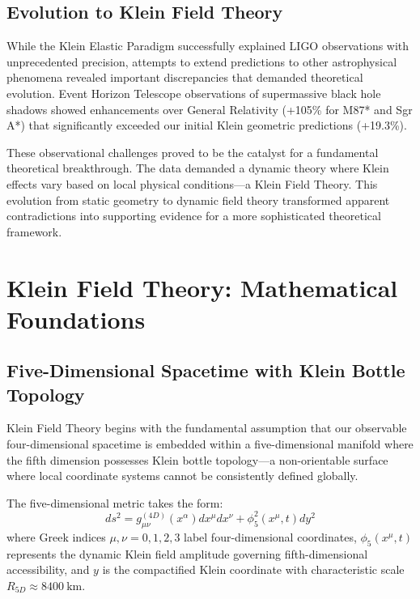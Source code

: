 \documentclass[aps,prl,twocolumn,showpacs,superscriptaddress,groupedaddress]{revtex4-1}
\newcommand{\phifive}{\phi_5}
\newcommand{\Rfive}{R_{5D}}
\begin{document}
\subsection{Evolution to Klein Field Theory}

While the Klein Elastic Paradigm successfully explained LIGO observations with unprecedented precision, attempts to extend predictions to other astrophysical phenomena revealed important discrepancies that demanded theoretical evolution. Event Horizon Telescope observations of supermassive black hole shadows showed enhancements over General Relativity (+105\% for M87* and Sgr A*) that significantly exceeded our initial Klein geometric predictions (+19.3\%).

These observational challenges proved to be the catalyst for a fundamental theoretical breakthrough. The data demanded a dynamic theory where Klein effects vary based on local physical conditions—a Klein Field Theory. This evolution from static geometry to dynamic field theory transformed apparent contradictions into supporting evidence for a more sophisticated theoretical framework.

\section{\label{sec:theory}Klein Field Theory: Mathematical Foundations}

\subsection{Five-Dimensional Spacetime with Klein Bottle Topology}

Klein Field Theory begins with the fundamental assumption that our observable four-dimensional spacetime is embedded within a five-dimensional manifold where the fifth dimension possesses Klein bottle topology—a non-orientable surface where local coordinate systems cannot be consistently defined globally.

The five-dimensional metric takes the form:
\begin{equation}
ds^2 = g_{\mu\nu}^{(4D)}(x^\alpha) dx^\mu dx^\nu + \phifive^2(x^\mu, t) dy^2
\label{eq:5d_metric}
\end{equation}
where Greek indices $\mu,\nu = 0,1,2,3$ label four-dimensional coordinates, $\phifive(x^\mu, t)$ represents the dynamic Klein field amplitude governing fifth-dimensional accessibility, and $y$ is the compactified Klein coordinate with characteristic scale $\Rfive \approx \SI{8400}{\kilo\meter}$.
\end{document}
